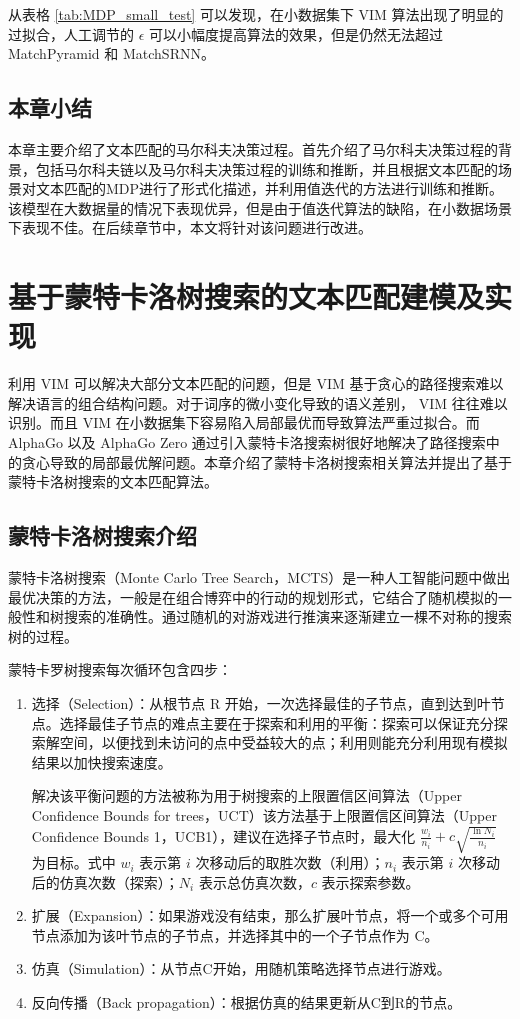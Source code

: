 从表格 \ref{tab:MDP_small_test} 可以发现，在小数据集下 VIM 算法出现了明显的过拟合，人工调节的 $\epsilon$ 可以小幅度提高算法的效果，但是仍然无法超过 MatchPyramid 和 MatchSRNN。

\section{本章小结}
本章主要介绍了文本匹配的马尔科夫决策过程。首先介绍了马尔科夫决策过程的背景，包括马尔科夫链以及马尔科夫决策过程的训练和推断，并且根据文本匹配的场景对文本匹配的MDP进行了形式化描述，并利用值迭代的方法进行训练和推断。该模型在大数据量的情况下表现优异，但是由于值迭代算法的缺陷，在小数据场景下表现不佳。在后续章节中，本文将针对该问题进行改进。

\chapter{基于蒙特卡洛树搜索的文本匹配建模及实现}
\label{chap:Zero}

利用 VIM 可以解决大部分文本匹配的问题，但是 VIM 基于贪心的路径搜索难以解决语言的组合结构问题。对于词序的微小变化导致的语义差别， VIM 往往难以识别。而且 VIM 在小数据集下容易陷入局部最优而导致算法严重过拟合。而 AlphaGo 以及 AlphaGo Zero 通过引入蒙特卡洛搜索树很好地解决了路径搜索中的贪心导致的局部最优解问题。本章介绍了蒙特卡洛树搜索相关算法并提出了基于蒙特卡洛树搜索的文本匹配算法。

\section{蒙特卡洛树搜索介绍}
\label{sec:MCTS_intro}
蒙特卡洛树搜索\cite{Coulom2006EfficientSA}（Monte Carlo Tree Search，MCTS）是一种人工智能问题中做出最优决策的方法，一般是在组合博弈中的行动的规划形式，它结合了随机模拟的一般性和树搜索的准确性。通过随机的对游戏进行推演来逐渐建立一棵不对称的搜索树的过程。

蒙特卡罗树搜索每次循环包含四步：
\begin{enumerate}
	\item 选择（Selection）：从根节点 R 开始，一次选择最佳的子节点，直到达到叶节点。选择最佳子节点的难点主要在于探索和利用的平衡：探索可以保证充分探索解空间，以便找到未访问的点中受益较大的点；利用则能充分利用现有模拟结果以加快搜索速度。
	
	解决该平衡问题的方法被称为用于树搜索的上限置信区间算法\cite{Kocsis2006BanditBM}（Upper Confidence Bounds for trees，UCT）该方法基于上限置信区间算法\cite{Auer2002FinitetimeAO}（Upper Confidence Bounds 1，UCB1），建议在选择子节点时，最大化 $\frac{w_i}{n_i} +c\sqrt{\frac{\ln N_i}{n_i}}$ 为目标。式中 $w_i$ 表示第 $i$ 次移动后的取胜次数（利用）；$n_i$ 表示第 $i$ 次移动后的仿真次数（探索）；$N_i$ 表示总仿真次数，$c$ 表示探索参数。

	\item 扩展（Expansion）：如果游戏没有结束，那么扩展叶节点，将一个或多个可用节点添加为该叶节点的子节点，并选择其中的一个子节点作为 C。

	\item 仿真（Simulation）：从节点C开始，用随机策略选择节点进行游戏。
	\item 反向传播（Back propagation）：根据仿真的结果更新从C到R的节点。
\end{enumerate}


